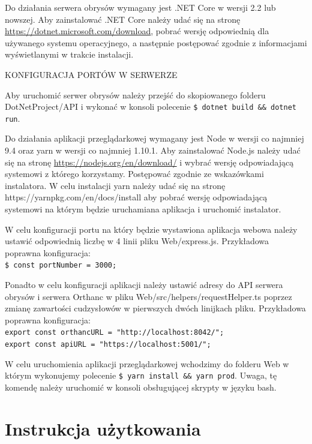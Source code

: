 \documentclass[a4paper,11pt,twoside]{report}
\theoremstyle{definition}
\begin{document}
Do działania serwera obrysów wymagany jest .NET Core w wersji 2.2 lub nowszej. Aby zainstalować .NET Core należy udać się na stronę \url{https://dotnet.microsoft.com/download}, pobrać wersję odpowiednią dla używanego systemu operacyjnego, a następnie postępować zgodnie z informacjami wyświetlanymi w trakcie instalacji.

KONFIGURACJA PORTÓW W SERWERZE

Aby uruchomić serwer obrysów należy przejść do skopiowanego folderu DotNetProject/API i wykonać w konsoli polecenie \texttt{\$ dotnet build \&\& dotnet run}.

Do działania aplikacji przeglądarkowej wymagany jest Node w wersji co najmniej 9.4 oraz yarn w wersji co najmniej 1.10.1. Aby zainstalować Node.js należy udać się na stronę \url{https://nodejs.org/en/download/} i wybrać wersję odpowiadającą systemowi z którego korzystamy. Postępować zgodnie ze wskazówkami instalatora. W celu instalacji yarn należy udać się na stronę https://yarnpkg.com/en/docs/install aby pobrać wersję odpowiadającą systemowi na którym będzie uruchamiana aplikacja i uruchomić instalator.

W celu konfiguracji portu na który będzie wystawiona aplikacja webowa należy ustawić odpowiednią liczbę w 4 linii pliku Web/express.js. Przykładowa poprawna konfiguracja:\\
\texttt{\$ const portNumber = 3000;}

Ponadto w celu konfiguracji aplikacji należy ustawić adresy do API serwera obrysów i serwera Orthanc w pliku Web/src/helpers/requestHelper.ts poprzez zmianę zawartości cudzysłowów w pierwszych dwóch linijkach pliku. 	Przykładowa poprawna konfiguracja:\\
\texttt{export const orthancURL = "http://localhost:8042/";}\\
\texttt{export const apiURL = "https://localhost:5001/";}

W celu uruchomienia aplikacji przeglądarkowej wchodzimy do folderu Web w którym wykonujemy polecenie \texttt{\$ yarn install \&\& yarn prod}. Uwaga, tę komendę należy uruchomić w konsoli obsługującej skrypty w języku bash.




\chapter*{Instrukcja użytkowania}
\end{document}

